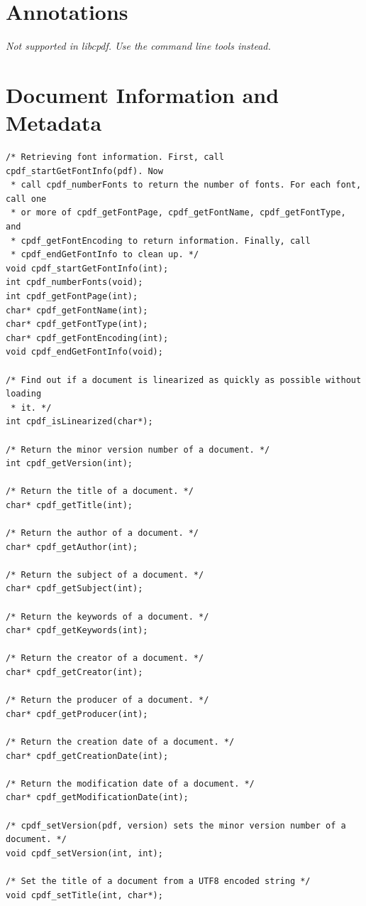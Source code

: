 \documentclass[a4paper]{memoir}
\begin{document}
\chapter{Annotations}
\textit{Not supported in libcpdf. Use the command line tools instead.}

\chapter{Document Information and Metadata}
\begin{small}
\begin{lstlisting}
/* Retrieving font information. First, call cpdf_startGetFontInfo(pdf). Now
 * call cpdf_numberFonts to return the number of fonts. For each font, call one
 * or more of cpdf_getFontPage, cpdf_getFontName, cpdf_getFontType, and
 * cpdf_getFontEncoding to return information. Finally, call
 * cpdf_endGetFontInfo to clean up. */
void cpdf_startGetFontInfo(int);
int cpdf_numberFonts(void);
int cpdf_getFontPage(int);
char* cpdf_getFontName(int);
char* cpdf_getFontType(int);
char* cpdf_getFontEncoding(int);
void cpdf_endGetFontInfo(void);

/* Find out if a document is linearized as quickly as possible without loading
 * it. */
int cpdf_isLinearized(char*);

/* Return the minor version number of a document. */
int cpdf_getVersion(int);

/* Return the title of a document. */
char* cpdf_getTitle(int);

/* Return the author of a document. */
char* cpdf_getAuthor(int);

/* Return the subject of a document. */
char* cpdf_getSubject(int);

/* Return the keywords of a document. */
char* cpdf_getKeywords(int);

/* Return the creator of a document. */
char* cpdf_getCreator(int);

/* Return the producer of a document. */
char* cpdf_getProducer(int);

/* Return the creation date of a document. */
char* cpdf_getCreationDate(int);

/* Return the modification date of a document. */
char* cpdf_getModificationDate(int);

/* cpdf_setVersion(pdf, version) sets the minor version number of a document. */
void cpdf_setVersion(int, int);

/* Set the title of a document from a UTF8 encoded string */
void cpdf_setTitle(int, char*);


\end{lstlisting}
\end{small}
\end{document}
